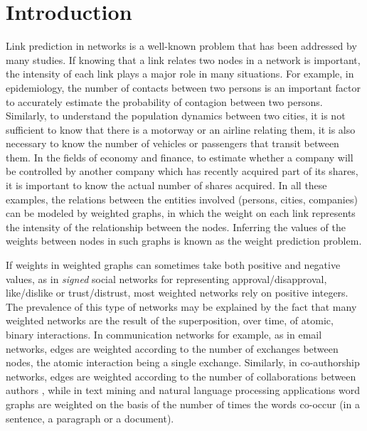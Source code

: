 \section{Introduction}

Link prediction in networks is a well-known problem that has been addressed by many studies. If knowing that a link relates two nodes in a network is important, the intensity of each link plays a major role in many situations. For example, in epidemiology, the number of contacts between two persons is an important factor to accurately estimate the probability of contagion between two persons. Similarly, to understand the population dynamics between two cities, it is not sufficient to know that there is a motorway or an airline relating them, it is also necessary to know the number of vehicles or passengers that transit between them. In the fields of economy and finance, to estimate whether a company will be controlled by another company which has recently acquired part of its shares, it is important to know the actual number of shares acquired. In all these examples, the relations between the entities involved (persons, cities, companies) can be modeled by weighted graphs, in which the weight on each link represents the intensity of the relationship between the nodes. Inferring the values of the weights between nodes in such graphs is known as the weight prediction problem.

If weights in weighted graphs can sometimes take both positive and negative values, as in \textit{signed} social networks for representing approval/disapproval, like/dislike or trust/distrust, most weighted networks rely on positive integers. The prevalence of this type of networks may be explained by the fact that many weighted networks are the result of the superposition, over time, of atomic, binary interactions. In communication networks for example, as in email networks, edges are weighted according to the number of exchanges between nodes, the atomic interaction being a single exchange. Similarly, in co-authorship networks, edges are weighted according to the number of collaborations between authors \cite{newman2001scientific}, while in text mining and natural language processing applications word graphs are weighted on the basis of the number of times the words co-occur (in a sentence, a paragraph or a document).

